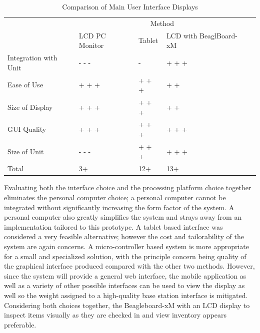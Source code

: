 \documentclass[11pt]{article} %
\begin{document}
\begin{table}[h!]
\vspace{0.5cm}
\caption{Comparison of Main User Interface Displays}
\begin{tabular}{| p{2in} | p{1in} | p{1.5in} | p{1.5in} | p{1.5in} |}
\cline{2-4}
\multicolumn{1}{c}{}&\multicolumn{3}{|c|}{Method} \\
\cline{2-4}
\multicolumn{1}{c|}{}&LCD PC \newline Monitor&Tablet&LCD with \newline BeaglBoard-xM\\
\hline
Integration with Unit&- - -&-&+ + +\\
\hline
Ease of Use&+ + +&+ + +&+ +\\
\hline
Size of Display& + + + &+ + +&+ +\\
\hline
GUI Quality&+ + +&+ + +&+ + +\\
\hline
Size of Unit&- - -&+ + +&+ + +\\
\hline
\hline
Total&3+&12+&13+\\
\hline
\end{tabular}
\label{tab:disp}
\end{table}
\noindent Evaluating both the interface choice and the processing platform choice together eliminates the personal computer choice; a personal computer cannot be integrated without significantly increasing the form factor of the system. A personal computer also greatly simplifies the system and strays away from an implementation tailored to this prototype. A tablet based interface was considered a very feasible alternative; however the cost and tailorability of the system are again concerns. A micro-controller based system is more appropriate for a small and specialized solution, with the principle concern being quality of the graphical interface produced compared with the other two methods. However, since the system will provide a general web interface, the mobile application as well as a variety of other possible interfaces can be used to view the display as well so the weight assigned to a high-quality base station interface is mitigated. Considering both choices together, the Beagleboard-xM with an LCD display to inspect items visually as they are checked in and view inventory appears preferable.
\end{document}
